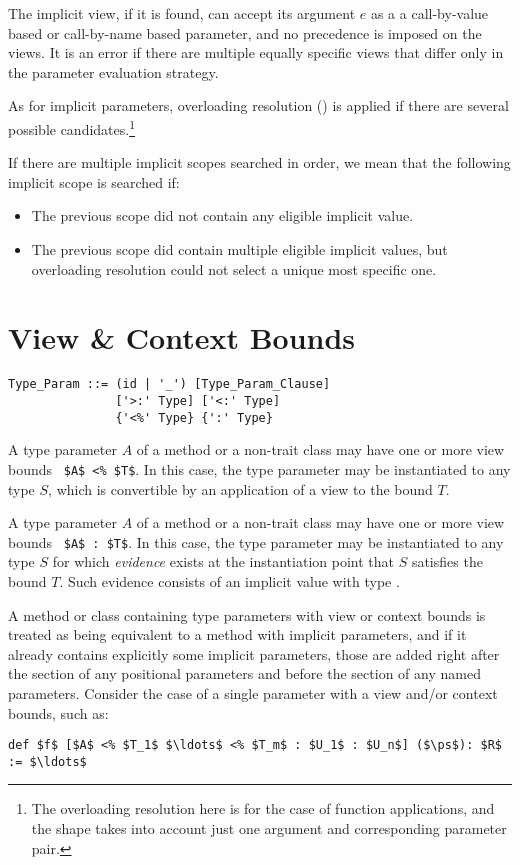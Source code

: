 The implicit view, if it is found, can accept its argument $e$ as a a call-by-value based or call-by-name based parameter, and no precedence is imposed on the views. It is an error if there are multiple equally specific views that differ only in the parameter evaluation strategy. 

As for implicit parameters, overloading resolution () is applied if there are several possible candidates.\footnote{The overloading resolution here is for the case of function applications, and the shape takes into account just one argument and corresponding parameter pair.}

If there are multiple implicit scopes searched in order, we mean that the following implicit scope is searched if:
\begin{itemize}
  \item The previous scope did not contain any eligible implicit value.
  \item The previous scope did contain multiple eligible implicit values, but overloading resolution could not select a unique most specific one. 
\end{itemize}





\section{View \& Context Bounds}
\label{sec:view-bounds}
\label{sec:context-bounds}

\syntax\begin{lstlisting}
Type_Param ::= (id | '_') [Type_Param_Clause]
               ['>:' Type] ['<:' Type]
               {'<%' Type} {':' Type}
\end{lstlisting}

A type parameter $A$ of a method or a non-trait class may have one or more view bounds ~\lstinline!$A$ <% $T$!. In this case, the type parameter may be instantiated to any type $S$, which is convertible by an application of a view to the bound $T$.

A type parameter $A$ of a method or a non-trait class may have one or more view bounds ~\lstinline!$A$ : $T$!. In this case, the type parameter may be instantiated to any type $S$ for which {\em evidence} exists at the instantiation point that $S$ satisfies the bound $T$. Such evidence consists of an implicit value with type . 

A method or class containing type parameters with view or context bounds is treated as being equivalent to a method with implicit parameters, and if it already contains explicitly some implicit parameters, those are added right after the section of any positional parameters and before the section of any named parameters. Consider the case of a single parameter with a view and/or context bounds, such as: 
\begin{lstlisting}
def $f$ [$A$ <% $T_1$ $\ldots$ <% $T_m$ : $U_1$ : $U_n$] ($\ps$): $R$ := $\ldots$
\end{lstlisting}

